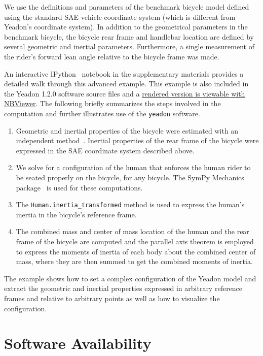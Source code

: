 \documentclass[10pt,a4paper,twocolumn]{article}
\begin{document}
We use the definitions and parameters of the benchmark bicycle model
\cite{Meijaard2007a} defined using the standard SAE vehicle coordinate system
(which is different from Yeadon's coordinate system). In addition to the
geometrical parameters in the benchmark bicycle, the bicycle rear frame and
handlebar location are defined by several geometric and inertial parameters.
Furthermore, a single measurement of the rider's forward lean angle relative to
the bicycle frame was made.

An interactive IPython~\cite{Perez2007} notebook in the supplementary materials
provides a detailed walk through this advanced example. This example is also
included in the Yeadon 1.2.0 software source files and a
\href{http://nbviewer.ipython.org/github/chrisdembia/yeadon/blob/v1.2.0/examples/bicyclerider/bicycle_example.ipynb}{rendered
  version is viewable with NBViewer}. The following briefly summarizes the
steps involved in the computation and further illustrates use of the
\verb+yeadon+ software.

\begin{enumerate}
  \item Geometric and inertial properties of the bicycle were estimated with an
    independent method~\cite{Moore2012}. Inertial properties of the rear frame
    of the bicycle were expressed in the SAE coordinate system described above.
  \item We solve for a configuration of the human that enforces the human rider
    to be seated properly on the bicycle, for any bicycle. The SymPy Mechanics
    package~\cite{Gede2013} is used for these computations.
  \item The \verb+Human.inertia_transformed+ method is used to express the
    human's inertia in the bicycle's reference frame.
  \item The combined mass and center of mass location of the human and the rear
    frame of the bicycle are computed and the parallel axis theorem is employed
    to express the moments of inertia of each body about the combined center of
    mass, where they are then summed to get the combined moments of inertia.
\end{enumerate}

The example shows how to set a complex configuration of the Yeadon model and
extract the geometric and inertial properties expressed in arbitrary reference
frames and relative to arbitrary points as well as how to visualize the
configuration.

\section*{Software Availability}
\end{document}
